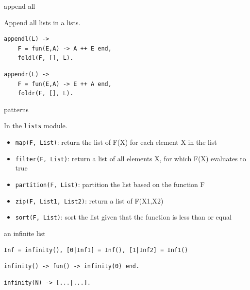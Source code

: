 \begin{frame}[fragile]{append all}

\pause Append all lists in a lists.

\vspace{20pt}

\begin{verbatim}
appendl(L) ->
    F = fun(E,A) -> A ++ E end,
    foldl(F, [], L).
\end{verbatim}

\begin{verbatim}
appendr(L) ->
    F = fun(E,A) -> E ++ A end,
    foldr(F, [], L).
\end{verbatim}

\end{frame}



\begin{frame}{patterns}

In the {\tt lists} module. 

\begin{itemize}
\item {\tt map(F, List)}: return the list of F(X) for each element X in the list
\pause
\item {\tt filter(F, List)}: return a list of all elements X, for which F(X) evaluates to true
\pause
\item {\tt partition(F, List)}: partition the list based on the function F
\pause
\item {\tt zip(F, List1, List2)}: return a list of F(X1,X2)
\pause
\item {\tt sort(F, List)}: sort the list given that the function is less than or equal
\end{itemize}

\end{frame}


\begin{frame}[fragile]{an infinite list}

\pause\vspace{20pt}

\verb+Inf = infinity()+\pause \verb+, [0|Inf1] = Inf()+\pause \verb+, [1|Inf2] = Inf1()+

\pause
\begin{verbatim}
infinity() -> fun() -> infinity(0) end.
\end{verbatim}
\pause
\begin{verbatim}
infinity(N) -> [...|...].
\end{verbatim}

\end{frame}


